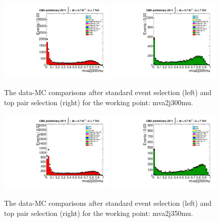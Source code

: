 \begin{figure}[!t]
  \centering
  \includegraphics[width=0.49\textwidth]{figs/cl-mva2j300mu-normal.pdf}
  \includegraphics[width=0.49\textwidth]{figs/cl-mva2j300mu-inTTbar.pdf}
  \caption{\label{fig:mva:plots-mva2j300mu} The data-MC comparisons
    after standard event selection (left) and top pair
    selection (right) for the working point: mva2j300mu.}
\end{figure}

\begin{figure}[!t]
  \centering
  \includegraphics[width=0.49\textwidth]{figs/cl-mva2j350mu-normal.pdf}
  \includegraphics[width=0.49\textwidth]{figs/cl-mva2j350mu-inTTbar.pdf}
  \caption{\label{fig:mva:plots-mva2j350mu} The data-MC comparisons
    after standard event selection (left) and top pair
    selection (right) for the working point: mva2j350mu.}
\end{figure}

